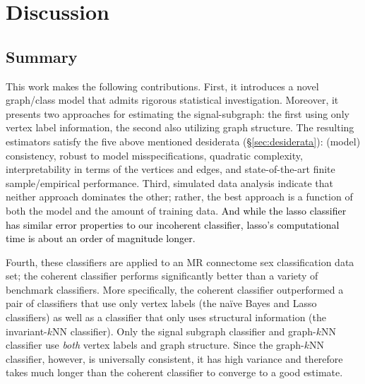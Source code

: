 \documentclass[10pt,journal,cspaper,compsoc]{IEEEtran}
\providecommand{\tk}[1]{\textcolor{black}{#1}}
\begin{document}









\section{Discussion} %
\label{sec:discussion}

\subsection{Summary} %
\label{sub:summary}

This work makes the following contributions. First, it introduces a novel graph/class model that admits rigorous statistical investigation.  Moreover, it presents two approaches for estimating the signal-subgraph: the first using only vertex label information, the second also utilizing graph structure.  The resulting estimators satisfy the five above mentioned desiderata (\S \ref{sec:desiderata}): (model) consistency, robust to model misspecifications, quadratic complexity, interpretability in terms of the vertices and edges, and state-of-the-art finite sample/empirical performance.    Third, simulated data analysis indicate that neither approach dominates the other; rather, the best approach is a function of both the model and the amount of training data. \tk{And while the lasso classifier has similar error properties to our incoherent classifier, lasso's computational time is about an order of magnitude longer.}


Fourth, these classifiers are applied to an MR connectome sex classification data set; the coherent classifier performs significantly better than a variety of benchmark classifiers.  
More specifically, the coherent classifier outperformed a pair of classifiers that use only vertex labels (the na\"ive Bayes and Lasso classifiers) as well as a classifier that only uses structural information (the invariant-$k$NN classifier).  Only the signal subgraph classifier and graph-$k$NN classifier use \emph{both} vertex labels and graph structure.  Since the graph-$k$NN classifier, however, is universally consistent, it has high variance and therefore takes much longer than the coherent classifier to converge to a good estimate.
\end{document}

